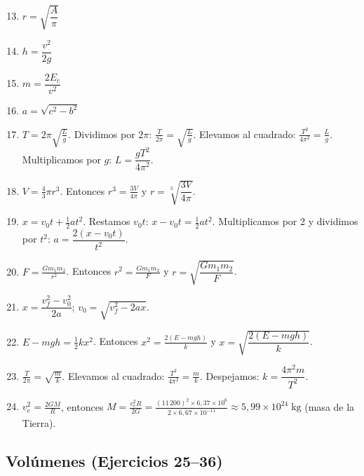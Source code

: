 \documentclass[12pt, letterpaper]{article}
\begin{document}
  \begin{enumerate}[leftmargin=*, label=\textbf{\arabic*.}]
    \setcounter{enumi}{12}
    \item $r = \sqrt{\dfrac{A}{\pi}}$

    \item $h = \dfrac{v^2}{2g}$

    \item $m = \dfrac{2E_c}{v^2}$

    \item $a = \sqrt{c^2 - b^2}$

    \item $T = 2\pi\sqrt{\frac{L}{g}}$. Dividimos por $2\pi$: $\frac{T}{2\pi} = \sqrt{\frac{L}{g}}$. Elevamos al cuadrado: $\frac{T^2}{4\pi^2} = \frac{L}{g}$. Multiplicamos por $g$: $L = \dfrac{gT^2}{4\pi^2}$.

    \item $V = \frac{4}{3}\pi r^3$. Entonces $r^3 = \frac{3V}{4\pi}$ y $r = \sqrt[3]{\dfrac{3V}{4\pi}}$.

    \item $x = v_0 t + \frac{1}{2}at^2$. Restamos $v_0 t$: $x - v_0 t = \frac{1}{2}at^2$. Multiplicamos por 2 y dividimos por $t^2$: $a = \dfrac{2(x - v_0 t)}{t^2}$.

    \item $F = \frac{Gm_1m_2}{r^2}$. Entonces $r^2 = \frac{Gm_1m_2}{F}$ y $r = \sqrt{\dfrac{Gm_1m_2}{F}}$.

    \item $x = \dfrac{v_f^2 - v_0^2}{2a}$; \quad $v_0 = \sqrt{v_f^2 - 2ax}$.

    \item $E - mgh = \frac{1}{2}kx^2$. Entonces $x^2 = \frac{2(E - mgh)}{k}$ y $x = \sqrt{\dfrac{2(E - mgh)}{k}}$.

    \item $\frac{T}{2\pi} = \sqrt{\frac{m}{k}}$. Elevamos al cuadrado: $\frac{T^2}{4\pi^2} = \frac{m}{k}$. Despejamos: $k = \dfrac{4\pi^2 m}{T^2}$.

    \item $v_e^2 = \frac{2GM}{R}$, entonces $M = \frac{v_e^2 R}{2G} = \frac{(11\,200)^2 \times 6{,}37 \times 10^6}{2 \times 6{,}67 \times 10^{-11}} \approx 5{,}99 \times 10^{24}\;\text{kg}$ (masa de la Tierra).
  \end{enumerate}

  \subsection*{Volúmenes (Ejercicios 25--36)}
\end{document}
